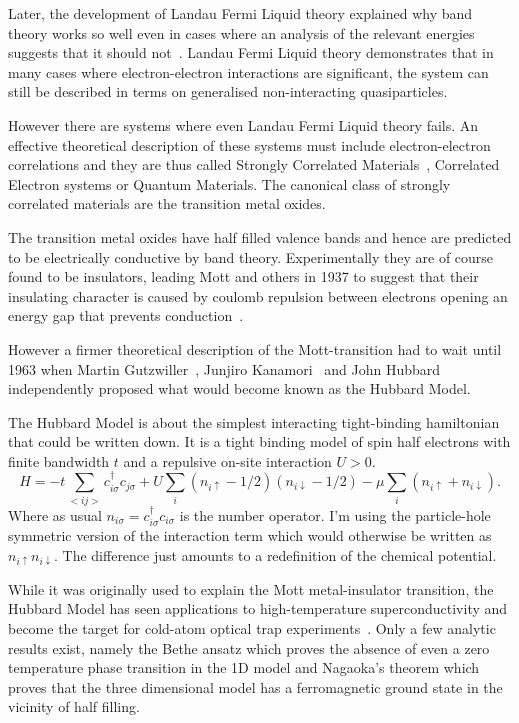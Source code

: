 Later, the development of Landau Fermi Liquid theory explained why band theory works so well even in cases where an analysis of the relevant energies suggests that it should not~\cite{wenQuantumFieldTheory2007}. Landau Fermi Liquid theory demonstrates that in many cases where electron-electron interactions are significant, the system can still be described in terms on generalised non-interacting quasiparticles.

However there are systems where even Landau Fermi Liquid theory fails. An effective theoretical description of these systems must include electron-electron correlations and they are thus called Strongly Correlated Materials~\cite{morosanStronglyCorrelatedMaterials2012}, Correlated Electron systems or Quantum Materials. The canonical class of strongly correlated materials are the transition metal oxides. 

The transition metal oxides have half filled valence bands and hence are predicted to be electrically conductive by band theory. Experimentally they are of course found to be insulators, leading Mott and others in 1937 to suggest that their insulating character is caused by coulomb repulsion between electrons opening an energy gap that prevents conduction~\cite{mottDiscussionPaperBoer1937}.

However a firmer theoretical description of the Mott-transition had to wait until 1963 when Martin Gutzwiller~\cite{gutzwillerEffectCorrelationFerromagnetism1963}, Junjiro Kanamori~\cite{kanamoriElectronCorrelationFerromagnetism1963} and John Hubbard~\cite{hubbardj.ElectronCorrelationsNarrow1963} independently proposed what would become known as the Hubbard Model.

The Hubbard Model is about the simplest interacting tight-binding hamiltonian that could be written down. It is a tight binding model of spin half electrons with finite bandwidth \(t\) and a repulsive on-site interaction \(U > 0\).
\[
    H = -t\sum_{<ij>}c^\dag_{i\sigma}c_{j\sigma} + U \sum_{i} (n_{i \uparrow} - 1/2)( n_{i\downarrow} - 1/2) - \mu \sum_i \left( n_{i \uparrow} + n_{i \downarrow} \right).
\]
Where as usual \(n_{i \sigma} = c^\dag_{i\sigma}c_{i\sigma}\) is the number operator. I'm using the particle-hole symmetric version of the interaction term which would otherwise be written as \(n_{i \uparrow} n_{i\downarrow}\). The difference just amounts to a redefinition of the chemical potential. 

While it was originally used to explain the Mott metal-insulator transition, the Hubbard Model has seen applications to high-temperature superconductivity and become the target for cold-atom optical trap experiments~\cite{noauthor_hubbard_2013, greiner_quantum_2002, jordens_mott_2008}. Only a few analytic results exist, namely the Bethe ansatz \cite{lieb_absence_1968} which proves the absence of even a zero temperature phase transition in the 1D model and Nagaoka’s theorem \cite{nagaoka_ferromagnetism_1966} which proves that the three dimensional model has a ferromagnetic ground state in the vicinity of half filling.

